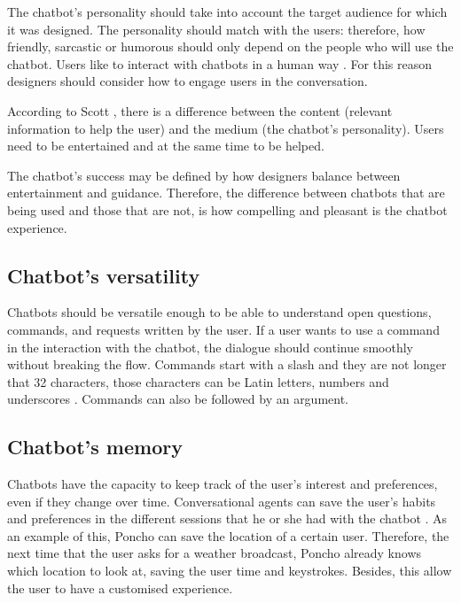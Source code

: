 \documentclass[a4paper,10pt]{article}
\begin{document}
The chatbot’s personality should take into account the target audience for which it was designed. The personality should match with the users: therefore, how friendly, sarcastic or humorous should only depend on the people who will use the chatbot. Users like to interact with chatbots in a human way \cite{HeuristicsWebPage}. For this reason designers should consider how to engage users in the conversation. 

According to Scott \cite{HeuristicsWebPage}, there is a difference between the content (relevant information to help the user) and the medium (the chatbot’s personality). Users need to be entertained and at the same time to be helped.

The chatbot’s success may be defined by how designers balance between entertainment and guidance. Therefore, the difference between chatbots that are being used and those that are not, is how compelling and pleasant is the chatbot experience.   

\subsection*{Chatbot's versatility}

Chatbots should be versatile enough to be able to understand open questions, commands, and requests written by the user. If a user wants to use a command in the interaction with the chatbot, the dialogue should continue smoothly without breaking the flow. Commands start with a slash and they are not longer that 32 characters, those characters can be Latin letters, numbers and underscores \cite{botfather}. Commands can also be followed by an argument. 

\subsection*{Chatbot's memory}

Chatbots have the capacity to keep track of the user's interest and preferences, even if they change over time. Conversational agents can save the user's habits and preferences in the different sessions that he or she had with the chatbot \cite{shneiderman1997direct}. As an example of this, Poncho can save the location of a certain user. Therefore, the next time that the user asks for a weather broadcast, Poncho already knows which location to look at, \cite{poncho2017} saving the user time and keystrokes. Besides, this allow the user to have a customised experience. 

\end{document}
